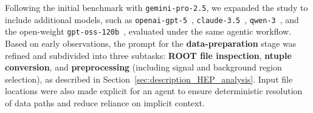 \documentclass[aps,prd,reprint,superscriptaddress]{revtex4-2}
\begin{document}




Following the initial benchmark with \texttt{gemini-pro-2.5}, we expanded the study to include additional models, such as \texttt{openai-gpt-5}~\citep{gpt5}, \texttt{claude-3.5}~\citep{anthropic2024claude35}, \texttt{qwen-3}~\citep{qwen3}, and the open-weight \texttt{gpt-oss-120b}~\citep{openai2025gptoss120bgptoss20bmodel}, evaluated under the same agentic workflow. Based on early observations, the prompt for the \textbf{data-preparation} stage was refined and subdivided into three subtasks: \textbf{ROOT file inspection}, \textbf{ntuple conversion}, and \textbf{preprocessing} (including signal and background region selection), as described in Section~\ref{sec:description_HEP_analysis}. Input file locations were also made explicit for an agent to ensure deterministic resolution of data paths and reduce reliance on implicit context.
\end{document}
